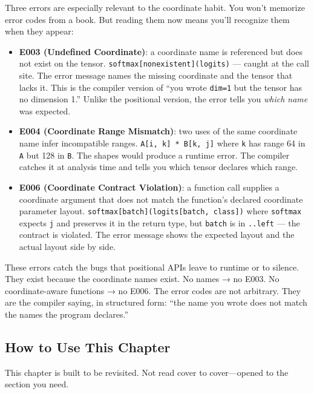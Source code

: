 \documentclass[11pt,titlepage]{article}
\begin{document}
Three errors are especially relevant to the coordinate habit. You won't
memorize error codes from a book. But reading them now means you'll
recognize them when they appear:

\begin{itemize}
\item
  \textbf{E003 (Undefined Coordinate)}: a coordinate name is referenced
  but does not exist on the tensor.
  \texttt{softmax{[}nonexistent{]}(logits)} --- caught at the call site.
  The error message names the missing coordinate and the tensor that
  lacks it. This is the compiler version of ``you wrote \texttt{dim=1}
  but the tensor has no dimension 1.'' Unlike the positional version,
  the error tells you \emph{which name} was expected.
\item
  \textbf{E004 (Coordinate Range Mismatch)}: two uses of the same
  coordinate name infer incompatible ranges.
  \texttt{A{[}i,\ k{]}\ *\ B{[}k,\ j{]}} where \texttt{k} has range 64
  in \texttt{A} but 128 in \texttt{B}. The shapes would produce a
  runtime error. The compiler catches it at analysis time and tells you
  which tensor declares which range.
\item
  \textbf{E006 (Coordinate Contract Violation)}: a function call
  supplies a coordinate argument that does not match the function's
  declared coordinate parameter layout.
  \texttt{softmax{[}batch{]}(logits{[}batch,\ class{]})} where
  \texttt{softmax} expects \texttt{j} and preserves it in the return
  type, but \texttt{batch} is in \texttt{..left} --- the contract is
  violated. The error message shows the expected layout and the actual
  layout side by side.
\end{itemize}

These errors catch the bugs that positional APIs leave to runtime or to
silence. They exist because the coordinate names exist. No names → no
E003. No coordinate-aware functions → no E006. The error codes are not
arbitrary. They are the compiler saying, in structured form: ``the name
you wrote does not match the names the program declares.''

\vspace{2em}

\hypertarget{how-to-use-this-chapter}{%
\subsection{How to Use This Chapter}\label{how-to-use-this-chapter}}

This chapter is built to be revisited. Not read cover to cover---opened
to the section you need.
\end{document}
